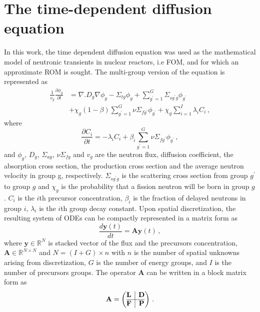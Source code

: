\documentclass[review,number,sort&compress,12pt]{elsarticle}
\begin{document}
\section{The time-dependent diffusion equation}
\label{sec:fom}
In this work, the time dependent diffusion equation was used as the mathematical model of neutronic transients in nuclear reactors, i.e FOM, and for which an approximate ROM is sought.
The multi-group version of the equation is represented as
\begin{equation}
\begin{split}
\frac{1}{v_g} \frac{\partial\phi_g}{\partial t} &= 
\nabla. D_g\nabla\phi_g - \Sigma_{tg}\phi_g + \sum_{g^\prime=1}^{G}{\Sigma_{sg^\prime g}}\phi_{g^\prime} \\
&+ \chi_g(1-\beta)\sum_{g^\prime = 1}^{G}\nu\Sigma_{fg^\prime}\phi_{g^\prime}  
+ \chi_g\sum_{i=1}^{I} \lambda_i C_i \, ,
\end{split}
\label{time_diff}
\end{equation}
where 
\begin{equation*}
\frac{\partial C_i}{\partial t} = -\lambda_i C_i + \beta_i \sum_{g^\prime=1}^{G} \nu\Sigma_{fg^\prime} \phi_{g^\prime} \, ,
\end{equation*}
and $\phi_g$, $D_g$, $\Sigma_{ag}$, $\nu\Sigma_{fg}$ and $v_g$ are the neutron flux, diffusion coefficient, the absorption cross section, the production cross section and the average neutron velocity in group g, respectively. $\Sigma_{sg^\prime g}$ is the scattering cross section from group $g^\prime$ to group $g$ 
and $\chi_g$ is the probability that a fission neutron will be born in group $g$.
$C_i$ is the $i$th precursor concentration, $\beta_i$ is the fraction of delayed neutrons in group $i$, $\lambda_i$ is the $i$th group decay constant.
Upon spatial discretization, the resulting system of ODEs can be compactly represented in a matrix form as  
\begin{equation}
\frac{d\mathbf{y}(t)}{dt} = \mathbf{A}\mathbf{y}(t) \, ,
\label{eq:transient fom}
\end{equation}
where $\mathbf{y}\in\mathbb{R}^{N}$ is stacked vector of the flux and the precursors concentration, $\mathbf{A}\in\mathbb{R}^{N\times N}$ and $N = (I + G)\times n$ with $n$ is the number of spatial unknowns arising from discretization, $G$ is the number of energy groups, and $I$ is the number of precursors groups.
The operator $\mathbf{A}$ can be written in a block matrix form as
\begin{equation}
\mathbf{A} =  \left(\begin{array}{@{}c|c@{}}
\mathbf{L} & \mathbf{D} \\
\hline
\mathbf{F} & \mathbf{P}
\end{array}\right) \, .
\end{equation} 
\end{document}
